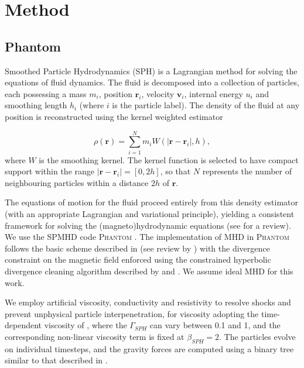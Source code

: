 \documentclass[a4paper,fleqn,usenatbib]{mnras}
\begin{document}
\section{Method}
\label{sec:method}

\subsection{Phantom}

\noindent Smoothed Particle Hydrodynamics (SPH) is a Lagrangian method for solving the equations of fluid dynamics.  The fluid is decomposed into a collection of particles, each possessing a mass $m_i$, position $\mathbf{r}_i$, velocity $\mathbf{v}_i$, internal energy $u_i$ and smoothing length $h_i$ (where $i$ is the particle label). The density of the fluid at any position is reconstructed using the kernel weighted estimator

\begin{equation}
\rho (\mathbf{r}) = \sum^{N}_{i=1} m_i W(\left|\mathbf{r} - \mathbf{r}_i\right|, h),
\end{equation}
where $W$ is the smoothing kernel.  The kernel function is selected to have compact support within the range  $\left|\mathbf{r} - \mathbf{r}_i\right| = [0,2h]$, so that $N$ represents the number of neighbouring particles within a distance $2h$ of $\mathbf{r}$.

The equations of motion for the fluid proceed entirely from this density estimator (with an appropriate Lagrangian and variational principle), yielding a consistent framework for solving the (magneto)hydrodynamic equations (see \citealt{Price2012} for a review).  We use the SPMHD code \textsc{Phantom} \citep{Price2017}. The implementation of MHD in \textsc{Phantom} follows the basic scheme described in \citet{Price2004,Price2004a,Price2005a} (see review by \citealt{Price2012}) with the divergence constraint on the magnetic field enforced using the constrained hyperbolic divergence cleaning algorithm described by \citet{Tricco2012} and \citet{Tricco2016}. We assume ideal MHD for this work.

We employ artificial viscosity, conductivity and resistivity to resolve shocks and prevent unphysical particle interpenetration, for viscosity adopting the time-dependent viscosity of \citet{Morris1997}, where the $\Gamma_{SPH}$ can vary between 0.1 and 1, and the corresponding non-linear viscosity term is fixed at $\beta_{SPH}=2$. The particles evolve on individual timesteps, and the gravity forces are computed using a binary tree similar to that described in \citet{Gafton2011}.
\end{document}
